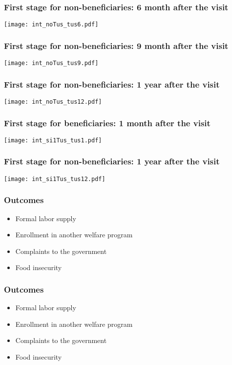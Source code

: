 \documentclass{beamer}
\begin{document}
\begin{frame}
\frametitle{First stage for non-beneficiaries: 6 month after the visit}
\begin{center}
\texttt{[image: int\_noTus\_tus6.pdf]}
\label{int_noTus_tus6}
\end{center}
\end{frame}

\begin{frame}
\frametitle{First stage for non-beneficiaries: 9 month after the visit}
\begin{center}
\texttt{[image: int\_noTus\_tus9.pdf]}
\label{int_noTus_tus9}
\end{center}
\end{frame}

\begin{frame}
\frametitle{First stage for non-beneficiaries: 1 year after the visit}
\begin{center}
	\texttt{[image: int\_noTus\_tus12.pdf]}
	\label{int_noTus_tus12}
\end{center}
\end{frame}

\begin{frame}
\frametitle{First stage for beneficiaries: 1 month after the visit}
\begin{center}
	\texttt{[image: int\_si1Tus\_tus1.pdf]}
	\label{int_si1Tus_tus1}
\end{center}
\end{frame}

\begin{frame}
\frametitle{First stage for non-beneficiaries: 1 year after the visit}
\begin{center}
\texttt{[image: int\_si1Tus\_tus12.pdf]}
\label{int_si1Tus_tus12.pdf}
\end{center}
\end{frame}

\begin{frame}
\frametitle{Outcomes}
\begin{itemize}	
	\item Formal labor supply
	\item Enrollment in another welfare program
	\item Complaints to the government
	\item Food insecurity
\end{itemize}
\end{frame}

\begin{frame}
\frametitle{Outcomes}
\begin{itemize}
	\item Formal labor supply
	\item {\color{gray}Enrollment in another welfare program}
	\item {\color{gray}Complaints to the government}
	\item {\color{gray}Food insecurity}
\end{itemize}
\end{frame}
\end{document}
